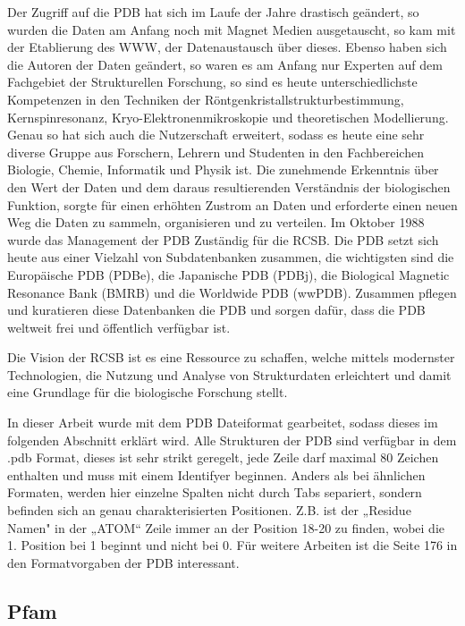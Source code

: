 Der Zugriff auf die PDB hat sich im Laufe der Jahre drastisch geändert, so wurden die Daten am Anfang noch mit Magnet Medien ausgetauscht, so kam mit der Etablierung des WWW, der Datenaustausch über dieses. Ebenso haben sich die Autoren der Daten geändert, so waren es am Anfang nur Experten auf dem Fachgebiet der Strukturellen Forschung, so sind es heute unterschiedlichste Kompetenzen in den Techniken der Röntgenkristallstrukturbestimmung, Kernspinresonanz, Kryo-Elektronenmikroskopie und theoretischen Modellierung. Genau so hat sich auch die Nutzerschaft erweitert, sodass es heute eine sehr diverse Gruppe aus Forschern, Lehrern und Studenten in den Fachbereichen Biologie, Chemie, Informatik und Physik ist. Die zunehmende Erkenntnis über den Wert der Daten und dem daraus resultierenden Verständnis der biologischen Funktion, sorgte für einen erhöhten Zustrom an Daten und erforderte einen neuen Weg die Daten zu sammeln, organisieren und zu verteilen. Im Oktober 1988 wurde das Management der PDB Zuständig für die RCSB. Die PDB setzt sich heute aus einer Vielzahl von Subdatenbanken zusammen, die wichtigsten sind die Europäische PDB (PDBe), die Japanische PDB (PDBj), die Biological Magnetic Resonance Bank (BMRB) und die Worldwide PDB (wwPDB). Zusammen pflegen und kuratieren diese Datenbanken die PDB und sorgen dafür, dass die PDB weltweit frei und öffentlich verfügbar ist.

Die Vision der RCSB ist es eine Ressource zu schaffen, welche mittels modernster Technologien, die Nutzung und Analyse von Strukturdaten erleichtert und damit eine Grundlage für die biologische Forschung stellt. 

In dieser Arbeit wurde mit dem PDB Dateiformat gearbeitet, sodass dieses im folgenden Abschnitt erklärt wird. Alle Strukturen der PDB sind verfügbar in dem .pdb Format, dieses ist sehr strikt geregelt, jede Zeile darf maximal 80 Zeichen enthalten und muss mit einem Identifyer beginnen. Anders als bei ähnlichen Formaten, werden hier einzelne Spalten nicht durch Tabs separiert, sondern befinden sich an genau charakterisierten Positionen. Z.B. ist der „Residue Namen" in der „ATOM“ Zeile immer an der Position 18-20 zu finden, wobei die 1. Position bei 1 beginnt und nicht bei 0. Für weitere Arbeiten ist die Seite 176 in den Formatvorgaben der PDB interessant.


\subsection{Pfam}

